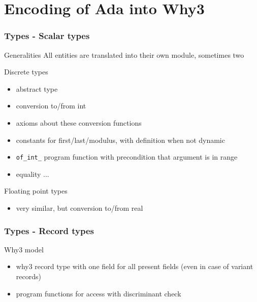 \documentclass{beamer}
\newenvironment{specialframe}{%
  \begin{frame}[fragile,environment=specialframe]}{\end{frame}}
\begin{document}


\section{Encoding of Ada into Why3}

\begin{specialframe}\frametitle{Types - Scalar types}
   \begin{block}{Generalities}
      All entities are translated into their own module, sometimes two
   \end{block}

   \begin{block}{Discrete types}
   \begin{itemize}
      \item abstract type
      \item conversion to/from int
      \item axioms about these conversion functions
      \item constants for first/last/modulus, with definition when not dynamic
      \item \verb|of_int_| program function with precondition that argument is
         in range
      \item equality ...
   \end{itemize}
   \end{block}
   \vspace{-1em}
   \begin{block}{Floating point types}
      \begin{itemize}
         \item very similar, but conversion to/from real
      \end{itemize}
   \end{block}
\end{specialframe}

\begin{specialframe}\frametitle{Types - Record types}
   \begin{block}{Why3 model}
      \begin{itemize}
         \item why3 record type with one field for all present fields
               (even in case of variant records)
         \item program functions for access with discriminant check
      \end{itemize}
   \end{block}
\end{specialframe}
\end{document}
